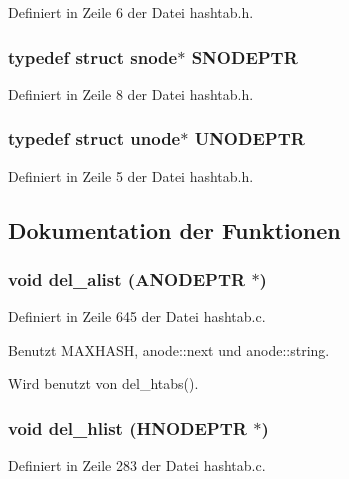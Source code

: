 Definiert in Zeile 6 der Datei hashtab.h.
\subsubsection{\setlength{\rightskip}{0pt plus 5cm}typedef struct {\bf snode}$\ast$ {\bf SNODEPTR}}\label{hashtab_8h_ba5bd50dc4074b21b1f1cfac70bb1fd5}




Definiert in Zeile 8 der Datei hashtab.h.
\subsubsection{\setlength{\rightskip}{0pt plus 5cm}typedef struct {\bf unode}$\ast$ {\bf UNODEPTR}}\label{hashtab_8h_0d24805080edbea320fb2c2ec31b229a}




Definiert in Zeile 5 der Datei hashtab.h.

\subsection{Dokumentation der Funktionen}
\subsubsection{\setlength{\rightskip}{0pt plus 5cm}void del\_\-alist ({\bf ANODEPTR} $\ast$)}\label{hashtab_8h_f22586d044db71a37c6df4e122019504}




Definiert in Zeile 645 der Datei hashtab.c.

Benutzt MAXHASH, anode::next und anode::string.

Wird benutzt von del\_\-htabs().
\subsubsection{\setlength{\rightskip}{0pt plus 5cm}void del\_\-hlist ({\bf HNODEPTR} $\ast$)}\label{hashtab_8h_faa716f0287d99c15c2f1d1b26d74ce0}




Definiert in Zeile 283 der Datei hashtab.c.

